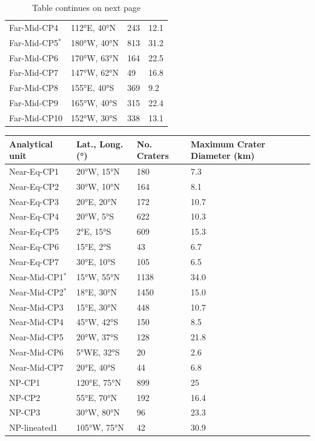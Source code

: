 \documentclass[preprint,11pt,3p,times,authoryear]{elsarticle}
\begin{document}
\begin{table}[ht!]
\begin{tabular}{p{4.0cm} p{3.0cm} p{2.0cm} p{3.0cm}}
  Far-Mid-CP4 & 112°E, 40°N & 243 &  12.1\\
  Far-Mid-CP5$^{*}$ & 180°W, 40°N & 813 & 31.2\\
  Far-Mid-CP6 & 170°W, 63°N & 164 &  22.5\\
  Far-Mid-CP7 & 147°W, 62°N & 49 &  16.8\\
  Far-Mid-CP8 & 155°E, 40°S & 369 &  9.2\\
  Far-Mid-CP9 & 165°W, 40°S & 315 &  22.4\\
  Far-Mid-CP10 & 152°W, 30°S & 338 & 13.1 \\
\hline
\end{tabular}
\caption*{Table continues on next page}
\end{table}

\begin{table}[ht!]
\centering
  \begin{tabular}{p{4.0cm} p{3.0cm} p{2.0cm} p{3.0cm} }
\hline
    \textbf{Analytical unit} & \textbf{Lat., Long. (°)} & \textbf{No. Craters} & \textbf{Maximum Crater Diameter (km)}\\
\hline
  Near-Eq-CP1 & 20°W, 15°N & 180 &  7.3\\
  Near-Eq-CP2 & 30°W, 10°N & 164 &  8.1\\
  Near-Eq-CP3 & 20°E, 20°N & 172 &  10.7\\
  Near-Eq-CP4 & 20°W, 5°S & 622 &  10.3\\
  Near-Eq-CP5 & 2°E, 15°S & 609 &  15.3\\
  Near-Eq-CP6 & 15°E, 2°S & 43 &  6.7\\
  Near-Eq-CP7 & 30°E, 10°S & 105 &  6.5\\
  Near-Mid-CP1$^{*}$ & 15°W, 55°N & 1138 & 34.0 \\
  Near-Mid-CP2$^{*}$ & 18°E, 30°N & 1450 & 15.0 \\
  Near-Mid-CP3 & 15°E, 30°N & 448 &  10.7\\
  Near-Mid-CP4 & 45°W, 42°S & 150 &  8.5\\
  Near-Mid-CP5 & 20°W, 37°S & 128 &  21.8\\
  Near-Mid-CP6 & 5°WE, 32°S & 20 &  2.6\\
  Near-Mid-CP7 & 20°E, 40°S & 44 &  6.8\\
  NP-CP1 & 120°E, 75°N & 899 &  25\\
  NP-CP2 & 55°E, 70°N & 192 &  16.4\\
  NP-CP3 & 30°W, 80°N & 96 &  23.3\\
  NP-lineated1 & 105°W, 75°N & 42 &  30.9\\

\end{tabular}
\end{table}
\end{document}
